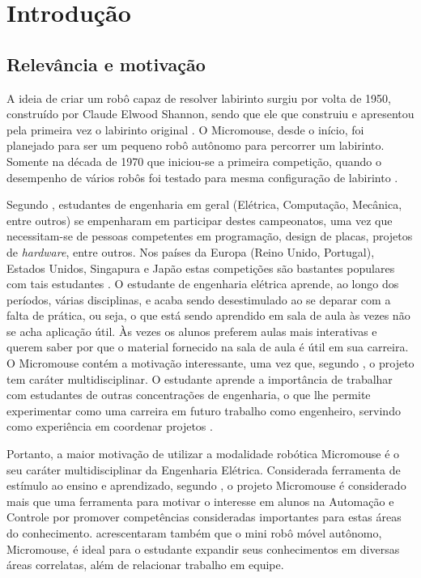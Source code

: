 \chapter{\textbf{Introdução}}\label{Introducao}

\section{Relevância e motivação}
A ideia de criar um robô capaz de resolver labirinto surgiu por volta de 1950, construído por Claude Elwood Shannon, sendo que ele que construiu e apresentou pela primeira vez o labirinto original . O Micromouse, desde o início, foi planejado para ser um pequeno robô autônomo para percorrer um labirinto. Somente na década de 1970 que iniciou-se a primeira competição, quando o desempenho de vários robôs foi testado para mesma configuração de labirinto \cite{5658360}.

Segundo , estudantes de engenharia em geral (Elétrica, Computação, Mecânica, entre outros) se empenharam em participar destes campeonatos, uma vez que necessitam-se de pessoas competentes em programação, design de placas, projetos de \textit{hardware}, entre outros. Nos países da Europa (Reino Unido, Portugal), Estados Unidos, Singapura e Japão estas competições são bastantes populares com tais estudantes \cite{6734188}. O estudante de engenharia elétrica aprende, ao longo dos períodos, várias disciplinas, e acaba sendo desestimulado ao se deparar com a falta de prática, ou seja, o que está sendo aprendido em sala de aula às vezes não se acha aplicação útil. Às vezes os alunos preferem aulas mais interativas e querem saber por que o material fornecido na sala de aula é útil em sua carreira. O Micromouse contém a motivação interessante, uma vez que, segundo , o projeto tem caráter multidisciplinar. O estudante aprende a importância de trabalhar com estudantes de outras concentrações de engenharia, o que lhe permite experimentar como uma carreira em futuro trabalho como engenheiro, servindo como experiência em coordenar projetos \cite{remendo1}. 

Portanto, a maior motivação de utilizar a modalidade robótica Micromouse é o seu caráter multidisciplinar da Engenharia Elétrica. Considerada ferramenta de estímulo ao ensino e aprendizado, segundo , o projeto Micromouse é considerado mais que uma ferramenta para motivar o interesse em alunos na Automação e Controle por promover competências consideradas importantes para estas áreas do conhecimento.  acrescentaram também que o mini robô móvel autônomo, Micromouse, é ideal para o estudante expandir seus conhecimentos em diversas áreas correlatas, além de relacionar trabalho em equipe.

